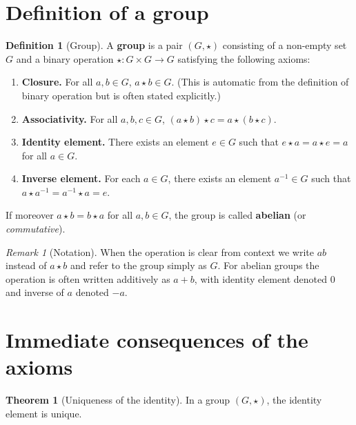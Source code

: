 \documentclass[12pt,a4paper,openany]{book}
\theoremstyle{definition}
\newtheorem{definition}{Definition}[chapter]
\newtheorem{theorem}{Theorem}[chapter]
\theoremstyle{remark}
\newtheorem{remark}{Remark}[chapter]
\begin{document}
\section{Definition of a group}
\label{sec:ch1-group-def}

\begin{definition}[Group]
\label{def:group}
A \textbf{group} is a pair $(G,\star)$ consisting of a non-empty set $G$
and a binary operation $\star\colon G\times G\to G$ satisfying the following
axioms:
\begin{enumerate}[label=\textbf{(G\arabic*)}]
  \item \label{ax:closure}
    \textbf{Closure.}  For all $a,b\in G$, $a\star b\in G$.
    (This is automatic from the definition of binary operation but is often
    stated explicitly.)
  \item \label{ax:assoc}
    \textbf{Associativity.}  For all $a,b,c\in G$,
    $(a\star b)\star c = a\star(b\star c)$.
  \item \label{ax:identity}
    \textbf{Identity element.}  There exists an element $e\in G$ such that
    $e\star a = a\star e = a$ for all $a\in G$.
  \item \label{ax:inverse}
    \textbf{Inverse element.}  For each $a\in G$, there exists an element
    $a^{-1}\in G$ such that $a\star a^{-1} = a^{-1}\star a = e$.
\end{enumerate}
If moreover $a\star b = b\star a$ for all $a,b\in G$, the group is called
\textbf{abelian} (or \emph{commutative}).
\end{definition}

\begin{remark}[Notation]
\label{rem:group-notation}
When the operation is clear from context we write $ab$ instead of
$a\star b$ and refer to the group simply as $G$.  For abelian groups the
operation is often written additively as $a+b$, with identity element
denoted $0$ and inverse of $a$ denoted $-a$.
\end{remark}

\section{Immediate consequences of the axioms}
\label{sec:ch1-consequences}

\begin{theorem}[Uniqueness of the identity]
\label{thm:unique-identity}
In a group $(G,\star)$, the identity element is unique.
\end{theorem}
\end{document}
